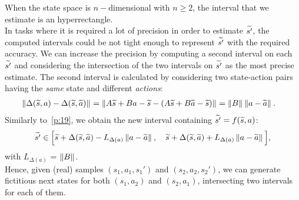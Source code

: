 When the state space is $n-$dimensional with $n\geq 2$, the interval that we estimate is an hyperrectangle.\\
\newline
In tasks where it is required a lot of precision in order to estimate $\widetilde{s'}$, the computed intervals could be not tight enough to represent $\widetilde{s'}$ with the required accuracy. We can increase the precision by computing a second interval on each $\widetilde{s'}$ and considering the intersection of the two intervals on $\widetilde{s'}$ as the most precise estimate. The second interval is calculated by considering two state-action pairs having the \emph{same} state and different \emph{actions}:
\begin{align}
\left\|\Delta(\widetilde{s},a) - \Delta(\widetilde{s}, \widetilde{a})\right\|_{} = \left\|A\widetilde{s}+Ba-\widetilde{s} - \left(A\widetilde{s}+B\widetilde{a}-\widetilde{s}\right)\right\|_{} &= \left\|B\right\|_{} \left\|a-\widetilde{a}\right\|_{}. \label{p:21}
\end{align}
Similarly to~\eqref{p:19}, we obtain the new interval containing $\widetilde{s'} = f(\widetilde{s}, a)$:
\begin{align}
\widetilde{s'} \in \Big[\widetilde{s} + \Delta(\widetilde{s},\widetilde{a}) - L_{\Delta (a)}\left\|a - \widetilde{a}\right\|_{}, \quad \widetilde{s} + \Delta(\widetilde{s},\widetilde{a}) + L_{\Delta (a)}\left\|a - \widetilde{a}\right\|_{} \Big],\label{p:25}
\end{align}
with $L_{\Delta (a)}$ = $\left\|B\right\|_{}$.\\
\newline
Hence, given (real) samples $(s_1,a_1,s_1')$ and $(s_2, a_2, s_2')$, we can generate fictitious next states for both $(s_1,a_2)$ and $(s_2,a_1)$, intersecting two intervals for each of them.

